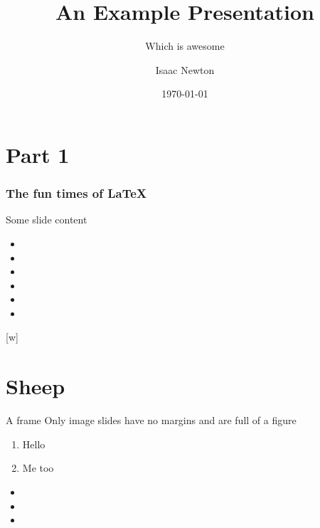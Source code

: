 \documentclass[xcolor={table}]{beamer}
\title{An Example Presentation}
\subtitle{Which is awesome}
\author{Isaac Newton}
\date{\today}
\begin{document}
\titleslide

\section{Part 1}

\begin{frame}
  \frametitle{The fun times of \LaTeX}
  Some slide content
\begin{itemize}
  \item \the\topmargin
  \item \the\headheight
  \item \the\headsep
  \item \the\textheight
  \item \the\footskip
  \item \the\paperheight
\end{itemize}
\end{frame}

[w]%

\section{Sheep}

\begin{frame}{A frame}
Only image slides have no margins and are full of a figure


\begin{enumerate}
  \item Hello
  \item Me too
\end{enumerate}
\begin{itemize}
  \item \the\paperheight
  \item \the\footskip
  \item \the\textheight
\end{itemize}
 \end{frame}
\end{document}
